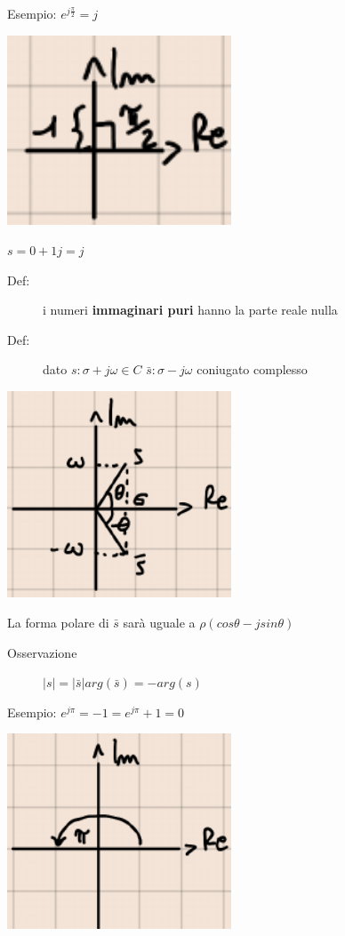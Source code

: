 \documentclass[a4paper, 12pt]{book}
\theoremstyle{plain}
\begin{document}
Esempio: $e^{j\frac{\pi}{2}}=j$
\begin{center}
    \includegraphics[width=0.5\textwidth]{num_comp3.png}
\end{center}
$s=0+1j=j$
\begin{description}
    \item[Def:] i numeri \textbf{immaginari puri} hanno la parte reale nulla
    \item[Def:] dato $s: \sigma + j\omega \in C$ $\bar{s}: \sigma - j\omega$ coniugato complesso   
\end{description}
\begin{center}
    \includegraphics[width=0.5\textwidth]{num_comp4.png}
\end{center}
La forma polare di $\bar{s}$ sarà uguale a $\rho (cos\theta - jsin\theta)$
\begin{description}
    \item[Osservazione] $|s|=|\bar{s}| arg(\bar{s})=-arg(s)$ 
\end{description}

Esempio: $e^{j\pi}=-1=e^{j\pi}+1=0$
\begin{center}
    \includegraphics[width=0.5\textwidth]{num_comp5.png}
\end{center}
\end{document}
